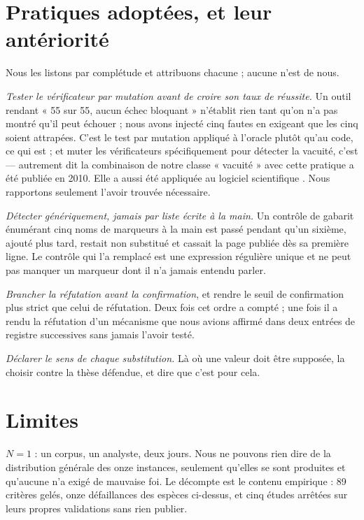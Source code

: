 \documentclass[11pt,a4paper]{article}
\begin{document}
\section{Pratiques adoptées, et leur antériorité}
\label{sec:pratiques}

Nous les listons par complétude et attribuons chacune ; aucune n'est de nous.

\emph{Tester le vérificateur par mutation avant de croire son taux de réussite.} Un outil
rendant « 55 sur 55, aucun échec bloquant » n'établit rien tant qu'on n'a pas montré qu'il peut
échouer ; nous avons injecté cinq fautes en exigeant que les cinq soient attrapées. C'est le
test par mutation \citep{jia2010} appliqué à l'oracle plutôt qu'au code, ce qui est
\citet{knauth2009} ; et muter les vérificateurs spécifiquement pour détecter la vacuité, c'est
\citet{date2010} --- autrement dit la combinaison de notre classe « vacuité » avec cette
pratique a été publiée en 2010. Elle a aussi été appliquée au logiciel scientifique
\citep{hook2009}. Nous rapportons seulement l'avoir trouvée nécessaire.

\emph{Détecter génériquement, jamais par liste écrite à la main.} Un contrôle de gabarit
énumérant cinq noms de marqueurs à la main est passé pendant qu'un sixième, ajouté plus tard,
restait non substitué et cassait la page publiée dès sa première ligne. Le contrôle qui l'a
remplacé est une expression régulière unique et ne peut pas manquer un marqueur dont il n'a
jamais entendu parler.

\emph{Brancher la réfutation avant la confirmation}, et rendre le seuil de confirmation plus
strict que celui de réfutation. Deux fois cet ordre a compté ; une fois il a rendu la
réfutation d'un mécanisme que nous avions affirmé dans deux entrées de registre successives
sans jamais l'avoir testé.

\emph{Déclarer le sens de chaque substitution.} Là où une valeur doit être supposée, la choisir
contre la thèse défendue, et dire que c'est pour cela.

\section{Limites}

$N=1$ : un corpus, un analyste, deux jours. Nous ne pouvons rien dire de la distribution
générale des onze instances, seulement qu'elles se sont produites et qu'aucune n'a exigé de
mauvaise foi. Le décompte est le contenu empirique : 89 critères gelés, onze défaillances des
espèces ci-dessus, et cinq études arrêtées sur leurs propres validations sans rien publier.
\end{document}
